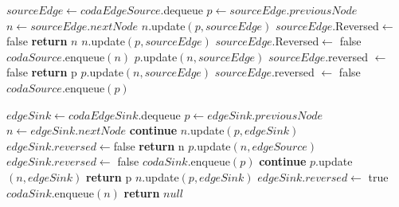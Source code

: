 \documentclass{article}
\begin{document}
\begin{algorithm}
    \begin{algorithmic}
        \STATE $sourceEdge \leftarrow codaEdgeSource.$dequeue
        \STATE $p \leftarrow sourceEdge.previousNode$
        \STATE $n \leftarrow sourceEdge.nextNode$
        \STATE $n.$update$(p,sourceEdge)$
        \STATE $sourceEdge$.Reversed$\leftarrow$ false
        \STATE\textbf{return} $n$
        \ENDIF
        \ELSE
        \STATE $n.$update$(p,sourceEdge)$
        \STATE $sourceEdge$.Reversed$\leftarrow$ false
        \STATE $codaSource.$enqueue$(n)$
        \ENDIF
        \STATE $p.$update$(n,sourceEdge)$
        \STATE $sourceEdge.$reversed $\leftarrow$ false
        \STATE \textbf{return} p
        \ENDIF
        \ELSE
        \STATE $p.$update$(n,sourceEdge)$
        \STATE $sourceEdge.$reversed $\leftarrow$ false
        \STATE$codaSource.$enqueue$(p)$
        \ENDIF
        \ENDIF
        \ENDIF
    \end{algorithmic}
\end{algorithm}
\newpage
\begin{algorithm}
    \begin{algorithmic}
        \STATE $edgeSink \leftarrow codaEdgeSink.$dequeue
        \STATE $p \leftarrow edgeSink.previousNode$
        \STATE $n \leftarrow edgeSink.nextNode$
        \STATE \textbf{continue}
        \ELSE
        \STATE $n.$update$(p,edgeSink)$
        \STATE $edgeSink.reversed \leftarrow $false
        \STATE \textbf{return} n
        \ENDIF
        \ENDIF
        \STATE $p.$update$(n,edgeSource)$
        \STATE$edgeSink.reversed \leftarrow$ false
        \STATE $codaSink.$enqueue$(p)$
        \STATE \textbf{continue}
        \ELSE
        \STATE $p.$update$(n,edgeSink)$
        \STATE \textbf{return} p
        \ENDIF
        \ENDIF
        \STATE $n.$update$(p,edgeSink)$
        \STATE $edgeSink.reversed \leftarrow$ true
        \STATE $codaSink.$enqueue$(n)$
        \ENDIF
        \ENDIF
        \ENDWHILE
        \ENDWHILE
        \STATE \textbf{return} $null$
    \end{algorithmic}
\end{algorithm}
\end{document}
